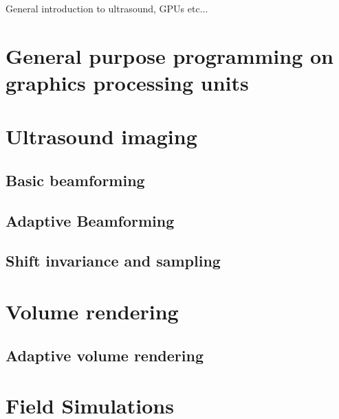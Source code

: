 %

General introduction to ultrasound, GPUs etc...

\section{General purpose programming on graphics processing units}

\section {Ultrasound imaging}
							
\subsection{Basic beamforming}

\subsection{Adaptive Beamforming}
						
\subsection{Shift invariance and sampling}

\section{Volume rendering}

\subsection{Adaptive volume rendering}

\section{Field Simulations}
			
\endinput
